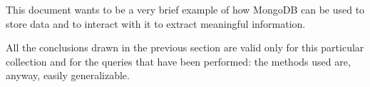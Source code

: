 This document wants to be a very brief example of how MongoDB can be used to store data and to interact with it to extract meaningful information.

All the conclusions drawn in the previous section are valid only for this particular collection and for the queries that have been performed: the methods used are, anyway, easily generalizable.